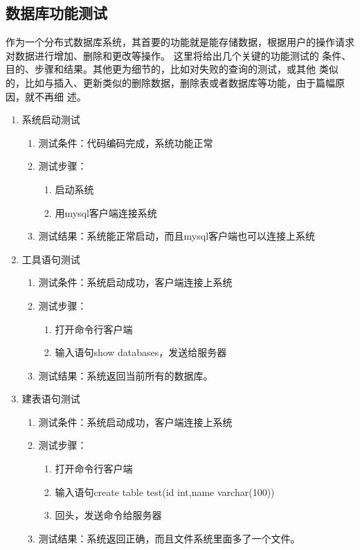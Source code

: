 \subsection{数据库功能测试}
作为一个分布式数据库系统，其首要的功能就是能存储数据，根据用户的操作请求对数据进行增加、删除和更改等操作。
这里将给出几个关键的功能测试的
条件、目的、步骤和结果。其他更为细节的，比如对失败的查询的测试，或其他
类似的，比如与插入、更新类似的删除数据，删除表或者数据库等功能，由于篇幅原因，就不再细
述。
\begin{enumerate}

	\item 系统启动测试
	\begin{enumerate}
		\item 测试条件：代码编码完成，系统功能正常
		\item 测试步骤：
		\begin{enumerate}
			\item 启动系统
			\item 用mysql客户端连接系统
		\end{enumerate}
	\item 	测试结果：系统能正常启动，而且mysql客户端也可以连接上系统
	\end{enumerate}



\item 工具语句测试
\begin{enumerate}
	\item 测试条件：系统启动成功，客户端连接上系统
	\item 测试步骤：
	\begin{enumerate}
		\item 打开命令行客户端
		\item 输入语句show databases，发送给服务器
	\end{enumerate}
	\item 	测试结果：系统返回当前所有的数据库。
\end{enumerate}	


\item 建表语句测试
\begin{enumerate}
	\item 测试条件：系统启动成功，客户端连接上系统
	\item 测试步骤：
	\begin{enumerate}
		\item 打开命令行客户端
		\item 输入语句create table test(id int,name	varchar(100))
		\item 回头，发送命令给服务器
	\end{enumerate}
	\item 	测试结果：系统返回正确，而且文件系统里面多了一个文件。
\end{enumerate}	



\end{enumerate}

